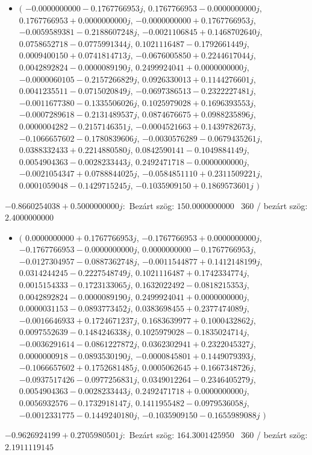 \documentclass[14pt,a4paper]{article}
\begin{document}
\begin{itemize}
\item
$\big($
$-0.0000000000-0.1767766953j$, $0.1767766953-0.0000000000j$, $0.1767766953+0.0000000000j$, $-0.0000000000+0.1767766953j$, $-0.0059589381-0.2188607248j$, $-0.0021106845+0.1468702640j$, $0.0758652718-0.0775991344j$, $0.1021116487-0.1792661449j$, $0.0009400150+0.0741814713j$, $-0.0676005850+0.2244617044j$, $0.0042892824-0.0000089190j$, $0.2499924041+0.0000000000j$, $-0.0000060105-0.2157266829j$, $0.0926330013+0.1144276601j$, $0.0041235511-0.0715020849j$, $-0.0697386513-0.2322227481j$, $-0.0011677380-0.1335506026j$, $0.1025979028+0.1696393553j$, $-0.0007289618-0.2131489537j$, $0.0874676675+0.0988235896j$, $0.0000004282-0.2157146351j$, $-0.0004521663+0.1439782673j$, $-0.1066657602-0.1780839606j$, $-0.0030576289-0.0679435261j$, $0.0388332433+0.2214880580j$, $0.0842590141-0.1049884149j$, $0.0054904363-0.0028233443j$, $0.2492471718-0.0000000000j$, $-0.0021054347+0.0788844025j$, $-0.0584851110+0.2311509221j$, $0.0001059048-0.1429715245j$, $-0.1035909150+0.1869573601j$
$\big)$
\end{itemize}
$-0.8660254038+0.5000000000j$:\
Bezárt szög: $150.0000000000$ \
360 / bezárt szög: $2.4000000000$\
\begin{itemize}
\item
$\big($
$0.0000000000+0.1767766953j$, $-0.1767766953+0.0000000000j$, $-0.1767766953-0.0000000000j$, $0.0000000000-0.1767766953j$, $-0.0127304957-0.0887362748j$, $-0.0011544877+0.1412148199j$, $0.0314244245-0.2227548749j$, $0.1021116487+0.1742334774j$, $0.0015154333-0.1723133065j$, $0.1632022492-0.0818215353j$, $0.0042892824-0.0000089190j$, $0.2499924041+0.0000000000j$, $0.0000031153-0.0893773452j$, $0.0383698455+0.2377474089j$, $-0.0016646933+0.1724671237j$, $0.1683639977+0.1000432862j$, $0.0097552639-0.1484246338j$, $0.1025979028-0.1835024714j$, $-0.0036291614-0.0861227872j$, $0.0362302941+0.2322045327j$, $0.0000000918-0.0893530190j$, $-0.0000845801+0.1449079393j$, $-0.1066657602+0.1752681485j$, $0.0005062645+0.1667348726j$, $-0.0937517426-0.0977256831j$, $0.0349012264-0.2346405279j$, $0.0054904363-0.0028233443j$, $0.2492471718+0.0000000000j$, $0.0056932576-0.1732918147j$, $0.1411955482-0.0979536058j$, $-0.0012331775-0.1449240180j$, $-0.1035909150-0.1655989088j$
$\big)$
\end{itemize}
$-0.9626924199+0.2705980501j$:\
Bezárt szög: $164.3001425950$ \
360 / bezárt szög: $2.1911119145$\
\end{document}

